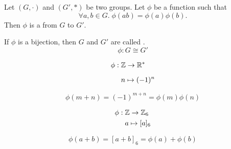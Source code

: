 
\begin{frame}
  \begin{definition}[Homomorphism (同态)]
    Let $(G, \cdot)$ and $(G', \ast)$ be two groups.
    Let $\phi$ be a function such that
    \[
      \forall a, b \in G.\; \phi(ab) = \phi(a)\phi(b).
    \]
    Then $\phi$ is a  from $G$ to $G'$.
  \end{definition}

  \pause
  \vspace{0.50cm}
  \begin{center}
    If $\phi$ is a bijection, then $G$ and $G'$ are called .
    \[
      \phi: G \cong G'
    \]
  \end{center}
\end{frame}

%

%

\begin{frame}{}
  \begin{align*}
    \phi:\; & \mathbb{Z} \to \mathbb{R}^{\ast} \\[6pt]
            & n \mapsto (-1)^{n}
  \end{align*}

  \pause
  \[
    \phi(m + n) = (-1)^{m+n} = \phi(m) \phi(n)
  \]
\end{frame}

\begin{frame}{}
  \begin{align*}
    \phi:\; & \mathbb{Z} \to \mathbb{Z}_{6} \\
            & a \mapsto [a]_{6}
  \end{align*}

  \[
    \phi(a + b) = [a + b]_{6} = \phi(a) + \phi(b)
  \]
\end{frame}


